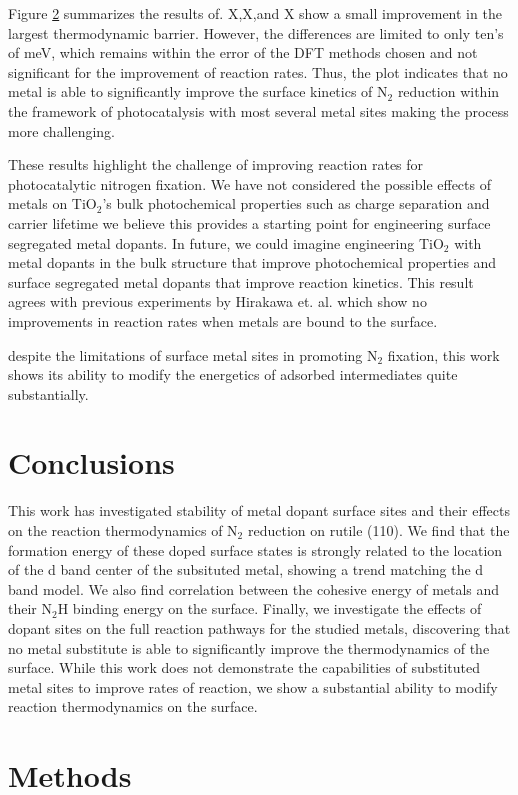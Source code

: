 \documentclass[catalysts,article,submit,moreauthors,pdftex,10pt,a4paper]{mdpi}
\theoremstyle{mdpi}
\newcounter{ex}
\newcounter{re}
\theoremstyle{mdpidefinition}
\begin{document}
Figure \ref{} summarizes the results of. X,X,and X show a small improvement in the largest thermodynamic barrier. However, the differences are limited to only ten's of meV, which remains within the error of the DFT methods chosen and not significant for the improvement of reaction rates. Thus, the plot indicates that no metal is able to significantly improve the surface kinetics of N$_2$ reduction within the framework of photocatalysis with most several metal sites making the process more challenging.

These results highlight the challenge of improving reaction rates for photocatalytic nitrogen fixation. We have not considered the possible effects of metals on TiO$_2$'s bulk photochemical properties such as charge separation and carrier lifetime we believe this provides a starting point for engineering surface segregated metal dopants. In future, we could imagine engineering TiO$_2$ with metal dopants in the bulk structure that improve photochemical properties and surface segregated metal dopants that improve reaction kinetics. This result agrees with previous experiments by Hirakawa et. al.\cite{Hirakawa_2017} which show no improvements in reaction rates when metals are bound to the surface.

despite the limitations of surface metal sites in promoting N$_2$ fixation, this work shows its ability to modify the energetics of adsorbed intermediates quite substantially. 

\section{Conclusions}
This work has investigated stability of metal dopant surface sites and their effects on the reaction thermodynamics of N$_2$ reduction on rutile (110). We find that the formation energy of these doped surface states is strongly related to the location of the d band center of the subsituted metal, showing a trend matching the d band model. We also find correlation between the cohesive energy of metals and their N$_2$H binding energy on the surface. Finally, we investigate the effects of dopant sites on the full reaction pathways for the studied metals, discovering that no metal substitute is able to significantly improve the thermodynamics of the surface. While this work does not demonstrate the capabilities of substituted metal sites to improve rates of reaction, we show a substantial ability to modify reaction thermodynamics on the surface.


\section{Methods}
\end{document}
